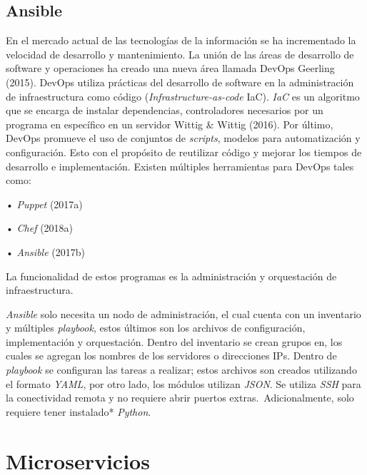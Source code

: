 \documentclass[12pt,twoside]{reedthesis}
\begin{document}
\hypertarget{ansible}{%
\subsection{Ansible}\label{ansible}}

En el mercado actual de las tecnologías de la información se ha incrementado la velocidad de desarrollo y mantenimiento.
La unión de las áreas de desarrollo de software y operaciones ha creado una nueva área llamada DevOps Geerling (2015). DevOps utiliza prácticas del desarrollo de software en la administración de infraestructura como código (\emph{Infrastructure-as-code} IaC). \emph{IaC} es un algoritmo que se encarga de instalar dependencias, controladores necesarios por un programa en específico en un servidor Wittig \& Wittig (2016). Por último, DevOps promueve el uso de conjuntos de \emph{scripts}, modelos para automatización y configuración. Esto con el propósito de reutilizar código y mejorar los tiempos de desarrollo e implementación. Existen múltiples herramientas para DevOps tales como:~

• \emph{Puppet} (2017a)~

• \emph{Chef} (2018a)~

• \emph{Ansible} (2017b)

La funcionalidad de estos programas es la administración y orquestación de infraestructura.

\emph{Ansible} solo necesita un nodo de administración, el cual cuenta con un inventario y múltiples \emph{playbook}, estos últimos son los archivos de configuración, implementación y orquestación. Dentro del inventario se crean grupos en, los cuales se agregan los nombres de los servidores o direcciones IPs. Dentro de \emph{playbook} se configuran las tareas a realizar; estos archivos son creados utilizando el formato \emph{YAML}, por otro lado, los módulos utilizan \emph{JSON}. Se utiliza \emph{SSH} para la conectividad remota y no requiere abrir puertos extras.~Adicionalmente, solo requiere tener instalado* \emph{Python}.

\hypertarget{microservicios}{%
\section{Microservicios}\label{microservicios}}
\end{document}
